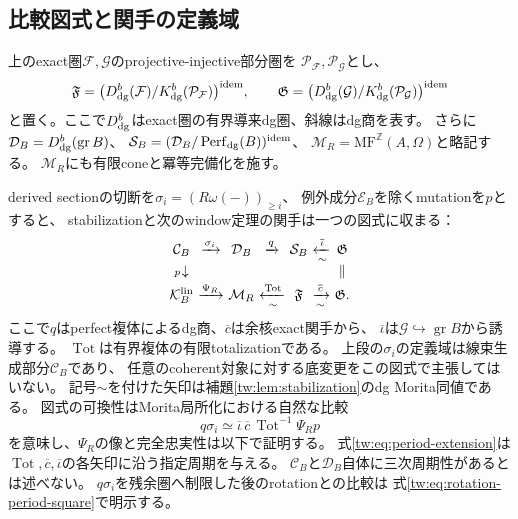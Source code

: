 \subsection{比較図式と関手の定義域}\label{tw:subsec:comparison}
上のexact圏$\mathcal F,\mathcal G$のprojective-injective部分圏を
$\mathcal P_{\mathcal F},\mathcal P_{\mathcal G}$とし、
\[
 \mathfrak F=
 \bigl(D^b_{\rm dg}(\mathcal F)/K^b_{\rm dg}(\mathcal P_{\mathcal F})\bigr)^{\rm idem},
 \qquad
 \mathfrak G=
 \bigl(D^b_{\rm dg}(\mathcal G)/K^b_{\rm dg}(\mathcal P_{\mathcal G})\bigr)^{\rm idem}
\]
と置く。ここで$D^b_{\rm dg}$はexact圏の有界導来dg圏、斜線はdg商を表す。
さらに$\mathcal D_B=D^b_{\rm dg}(\operatorname{gr}B)$、
$\mathcal S_B=(\mathcal D_B/\operatorname{Perf}_{\rm dg}(B))^{\rm idem}$、
$\mathcal M_R=\mathrm{MF}^{\mathbb Z}(A,\Omega)$と略記する。
$\mathcal M_R$にも有限coneと冪等完備化を施す。

derived sectionの切断を$\sigma_i=(R\omega(-))_{\ge i}$、
例外成分$\mathcal E_B$を除くmutationを$p$とすると、
stabilizationと次のwindow定理の関手は一つの図式に収まる：
\begin{equation}\label{tw:eq:comparison-diagram}
 \begin{array}{c@{\ }c@{\ }c@{\ }c@{\ }c@{\ }c@{\ }c}
 \mathcal C_B&\xrightarrow{\sigma_i}&\mathcal D_B&\xrightarrow{q}&
 \mathcal S_B&\xleftarrow[\sim]{\overline\iota}&\mathfrak G\\[2pt]
 {\scriptstyle p}\!\downarrow&&&&&&\Vert\\[2pt]
 \mathcal K_B^{\rm lin}&\xrightarrow{\Psi_R}&\mathcal M_R&
 \xleftarrow[\sim]{\operatorname{Tot}}&\mathfrak F&
 \xrightarrow[\sim]{\overline c}&\mathfrak G .
 \end{array}
\end{equation}
ここで$q$はperfect複体によるdg商、$\overline c$は余核exact関手から、
$\overline\iota$は$\mathcal G\hookrightarrow\operatorname{gr}B$から誘導する。
$\operatorname{Tot}$は有界複体の有限totalizationである。
上段の$\sigma_i$の定義域は線束生成部分$\mathcal C_B$であり、
任意のcoherent対象に対する底変更をこの図式で主張してはいない。
記号$\sim$を付けた矢印は補題\ref{tw:lem:stabilization}のdg Morita同値である。
図式の可換性はMorita局所化における自然な比較
\begin{equation}\label{tw:eq:comparison-composite}
 q\sigma_i\simeq
 \overline\iota\,\overline c\,\operatorname{Tot}^{-1}\Psi_Rp
\end{equation}
を意味し、$\Psi_R$の像と完全忠実性は以下で証明する。
式\eqref{tw:eq:period-extension}は
$\operatorname{Tot},\overline c,\overline\iota$の各矢印に沿う指定周期を与える。
$\mathcal C_B$と$\mathcal D_B$自体に三次周期性があるとは述べない。
$q\sigma_i$を残余圏へ制限した後のrotationとの比較は
式\eqref{tw:eq:rotation-period-square}で明示する。

